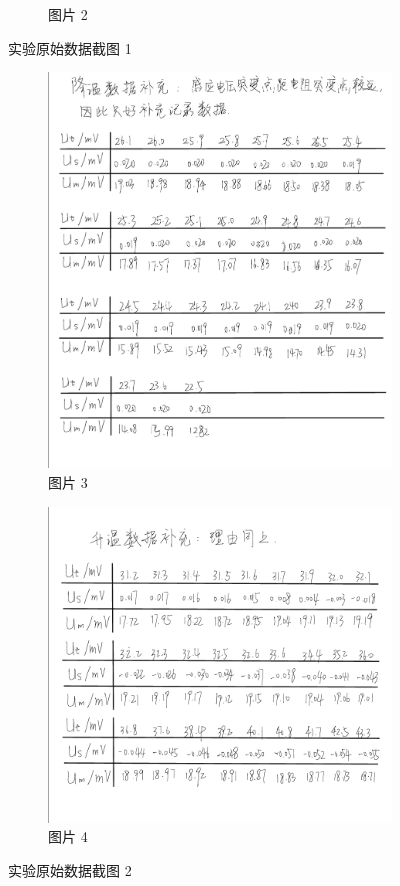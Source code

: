 \documentclass{THUexprep}
\begin{document}
\begin{figure}[H]
\begin{subfigure}{0.45\textwidth}
        \caption{图片 2}
    \end{subfigure}
    \caption{实验原始数据截图 1}
\end{figure}
\begin{figure}[H]
    \begin{subfigure}{0.45\textwidth}
        \centering
        \includegraphics[width=\textwidth]{3.png}
        \caption{图片 3}
    \end{subfigure}
    \begin{subfigure}{0.45\textwidth}
        \centering
        \includegraphics[width=\textwidth]{4.png}
        \caption{图片 4}
    \end{subfigure}
    \caption{实验原始数据截图 2}
\end{figure}
\end{document}
